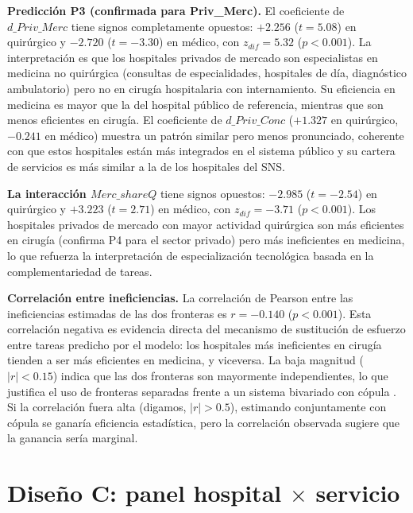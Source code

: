 \textbf{Predicción P3 (confirmada para Priv\_Merc).} El coeficiente de $d\_Priv\_Merc$ tiene signos completamente opuestos: $+2.256$ ($t=5.08$) en quirúrgico y $-2.720$ ($t=-3.30$) en médico, con $z_{dif}=5.32$ ($p<0.001$). La interpretación es que los hospitales privados de mercado son especialistas en medicina no quirúrgica (consultas de especialidades, hospitales de día, diagnóstico ambulatorio) pero no en cirugía hospitalaria con internamiento. Su eficiencia en medicina es mayor que la del hospital público de referencia, mientras que son menos eficientes en cirugía. El coeficiente de $d\_Priv\_Conc$ ($+1.327$ en quirúrgico, $-0.241$ en médico) muestra un patrón similar pero menos pronunciado, coherente con que estos hospitales están más integrados en el sistema público y su cartera de servicios es más similar a la de los hospitales del SNS.

\textbf{La interacción $Merc\_shareQ$} tiene signos opuestos: $-2.985$ ($t=-2.54$) en quirúrgico y $+3.223$ ($t=2.71$) en médico, con $z_{dif}=-3.71$ ($p<0.001$). Los hospitales privados de mercado con mayor actividad quirúrgica son más eficientes en cirugía (confirma P4 para el sector privado) pero más ineficientes en medicina, lo que refuerza la interpretación de especialización tecnológica basada en la complementariedad de tareas.

\textbf{Correlación entre ineficiencias.} La correlación de Pearson entre las ineficiencias estimadas de las dos fronteras es $r=-0.140$ ($p<0.001$). Esta correlación negativa es evidencia directa del mecanismo de sustitución de esfuerzo entre tareas predicho por el modelo: los hospitales más ineficientes en cirugía tienden a ser más eficientes en medicina, y viceversa. La baja magnitud ($|r|<0.15$) indica que las dos fronteras son mayormente independientes, lo que justifica el uso de fronteras separadas frente a un sistema bivariado con cópula \citep{kumbhakar1997}. Si la correlación fuera alta (digamos, $|r|>0.5$), estimando conjuntamente con cópula se ganaría eficiencia estadística, pero la correlación observada sugiere que la ganancia sería marginal.


\section{Diseño C: panel hospital \texorpdfstring{$\times$}{x} servicio}

